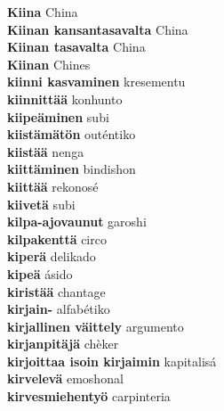 \textbf{ Kiina  } China \\
\textbf{ Kiinan kansantasavalta  } China \\
\textbf{ Kiinan tasavalta  } China \\
\textbf{ Kiinan  } Chines \\
\textbf{ kiinni kasvaminen  } kresementu \\
\textbf{ kiinnittää  } konhunto \\
\textbf{ kiipeäminen  } subi \\
\textbf{ kiistämätön  } outéntiko \\
\textbf{ kiistää  } nenga \\
\textbf{ kiittäminen  } bindishon \\
\textbf{ kiittää  } rekonosé \\
\textbf{ kiivetä  } subi \\
\textbf{ kilpa-ajovaunut  } garoshi \\
\textbf{ kilpakenttä  } circo \\
\textbf{ kiperä  } delikado \\
\textbf{ kipeä  } ásido \\
\textbf{ kiristää  } chantage \\
\textbf{ kirjain-  } alfabétiko \\
\textbf{ kirjallinen väittely  } argumento \\
\textbf{ kirjanpitäjä  } chèker \\
\textbf{ kirjoittaa isoin kirjaimin  } kapitalisá \\
\textbf{ kirvelevä  } emoshonal \\
\textbf{ kirvesmiehentyö  } carpinteria \\
